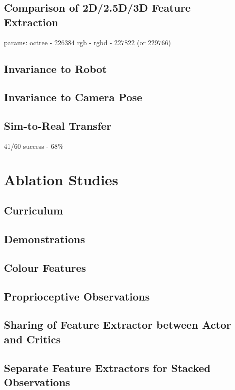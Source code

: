 \subsection{Comparison of 2D/2.5D/3D Feature Extraction}

params:
    octree - 226384
    rgb -
    rgbd - 227822 (or 229766)


\subsection{Invariance to Robot}

\subsection{Invariance to Camera Pose}

\subsection{Sim-to-Real Transfer}

41/60 success
- 68\%


\section{Ablation Studies}

\subsection{Curriculum}

\subsection{Demonstrations}

\subsection{Colour Features}

\subsection{Proprioceptive Observations}

\subsection{Sharing of Feature Extractor between Actor and Critics}

\subsection{Separate Feature Extractors for Stacked Observations}

